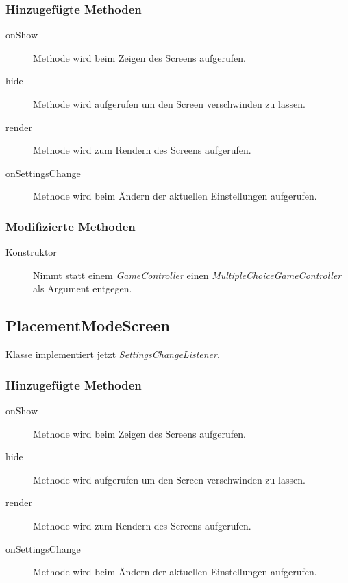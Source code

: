 \subsubsection{Hinzugefügte Methoden}
\begin{description}

\item[onShow]
Methode wird beim Zeigen des Screens aufgerufen.

\item[hide]
Methode wird aufgerufen um den Screen verschwinden zu lassen.

\item[render]
Methode wird zum Rendern des Screens aufgerufen.

\item[onSettingsChange]
Methode wird beim Ändern der aktuellen Einstellungen aufgerufen.
\end{description}

\subsubsection{Modifizierte Methoden}
\begin{description}
\item[Konstruktor]
Nimmt statt einem \emph{GameController} einen \emph{MultipleChoiceGameController} als Argument entgegen.

\end{description}

\subsection{PlacementModeScreen}
Klasse implementiert jetzt \emph{SettingsChangeListener}.

\subsubsection{Hinzugefügte Methoden}
\begin{description}

\item[onShow]
Methode wird beim Zeigen des Screens aufgerufen.

\item[hide]
Methode wird aufgerufen um den Screen verschwinden zu lassen.

\item[render]
Methode wird zum Rendern des Screens aufgerufen.

\item[onSettingsChange]
Methode wird beim Ändern der aktuellen Einstellungen aufgerufen.
\end{description}

